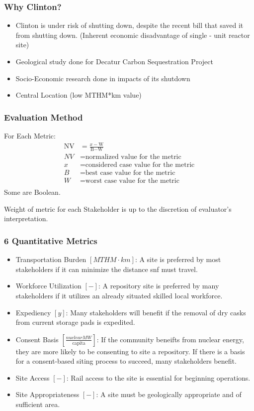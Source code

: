 \begin{frame}
	\frametitle{Why Clinton?}
	\begin{itemize}
		\item Clinton is under risk of shutting down, despite the recent bill that saved
		it from shutting down. (Inherent economic disadvantage of single - unit reactor site)
		\item Geological study done for Decatur Carbon Sequestration Project
		\item Socio-Economic research done in impacts of its shutdown
		\item Central Location (low MTHM*km value)
	\end{itemize}
\end{frame}

\begin{frame}
	\frametitle{Evaluation Method}
	For Each Metric:
	\begin{align} 
	\mbox{NV} &= \frac{x-\mbox{W}}{\mbox{B}-\mbox{W}}\\
	NV &= \mbox{normalized value for the metric}\\
	x &= \mbox{considered case value for the metric}\\
	B &= \mbox{best case value for the metric}\\
	W &= \mbox{worst case value for the metric}\\
	\end{align}
	Some are Boolean.
		
	Weight of metric for each Stakeholder is up to the discretion of evaluator's interpretation.
\end{frame}

\begin{frame}
	\frametitle{6 Quantitative Metrics}
	\begin{itemize}
			\item Transportation Burden $[MTHM \cdot km]$: A site is preferred by 
			most stakeholders if it can minimize the distance snf 
			must travel.
			\item Workforce Utilization $[-]$: A repository site is preferred by 
			many stakeholders if it utilizes an already situated skilled local 
			workforce. 
			\item Expediency $[y]$: Many stakeholders will benefit if the removal 
			of dry casks from current storage pads is expedited.
			\item Consent Basis $[\frac{nuclear MW}{\mbox{capita}}]$: If the community
			beneifts from nuclear energy, they are more likely to be consenting to
			site a repository. If there is a basis for a consent-based 
			siting process to succeed, many stakeholders benefit.
			\item Site Access $[-]$: Rail access to the site is essential for 
			beginning operations.
			\item Site Appropriateness $[-]$: A site must be geologically 
			appropriate and of sufficient area.
	\end{itemize}

\end{frame}

